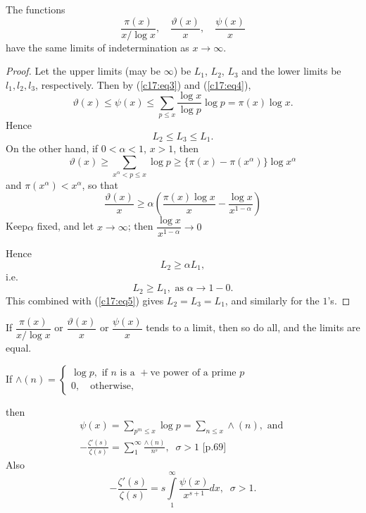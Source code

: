 \begin{thm}\label{chap17:thm2}
The functions
$$
\frac{\pi(x)}{x/\log x}, \quad \frac{\vartheta(x)}{x}, \quad
\frac{\psi(x)}{x} 
$$
have the same limits of indetermination as $x \to \infty$.
\end{thm}

\begin{proof}
Let the upper limits (may be $\infty$) be $L_1$, $L_2$, $L_3$ and the
lower limits be $l_1, l_2, l_3$, respectively. Then by (\ref{c17:eq3}) and (\ref{c17:eq4}), 
$$
\vartheta(x) \leq \psi(x) \leq \sum\limits_{p\leq x} \frac{\log
  x}{\log p} \log p = \pi (x) \log  x.
$$
Hence
\begin{equation*}
L_2 \leq L_3 \leq L_1. \tag{5}\label{c17:eq5}
\end{equation*}
On the other hand, if $0< \alpha < 1$, $x>1$, then 
$$
\vartheta (x) \geq \sum\limits_{x^{\alpha} < p \leq x} \log p \geq
\{\pi(x) - \pi (x^{\alpha})\} \log x^{\alpha}
$$
and $\pi (x^{\alpha}) < x^{\alpha}$, so that
$$
\frac{\vartheta (x)}{x} \geq  \alpha \left(\frac{\pi(x) \log x}{x} -
\frac{\log x}{x^{1-\alpha}}  \right) 
$$
Keep\pageoriginale $\alpha$ fixed, and let $x\to \infty$; then
$\dfrac{\log x}{x^{1-\alpha}} \to 0$

Hence
$$
L_2 \geq \alpha L_1, 
$$
i.e.
$$
L_2 \geq L_1, \text{ as } \alpha \to 1 - 0.
$$
This combined with (\ref{c17:eq5}) gives $L_2 = L_3 = L_1$, and similarly for the
$1$'s. 
\end{proof}

\begin{coro*}
If $\dfrac{\pi (x)}{x/\log x}$ or $\dfrac{\vartheta(x)}{x}$ or
$\dfrac{\psi(x)}{x}$ tends to a limit, then so do all, and the limits
are equal.
\end{coro*}

\begin{remarks*}
If $\wedge(n)= \begin{cases}
\log p, \text{ if $n$ is a $+$ve power of a prime $p$}\\ 
0, \quad  \text{otherwise},
\end{cases}
$

\noindent
then 
\begin{gather*}
\psi(x) = \sum\limits_{p^m\leq x} \log p = \sum\limits_{n \leq x}
\wedge(n),  \text{ and }\\
- \frac{\zeta'(s)}{\zeta(s)} = \sum\limits^\infty_1
\frac{\wedge(n)}{n^s}, \;\; \sigma >1 \text{ [p.69]}
\end{gather*}
Also
$$ 
-\frac{\zeta'(s)}{\zeta(s)} = s\int\limits^\infty_1
\frac{\psi(x)}{x^{s+1}}  dx, \;\; \sigma >1. 
$$
\end{remarks*}

